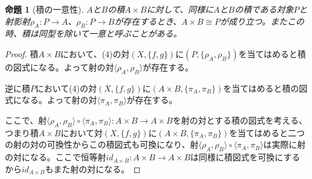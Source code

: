 \documentclass[dvipdfmx]{jsarticle}
\newcommand{\arrow}{\rightarrow}
\newcommand{\tuple}[1]{\langle #1\rangle}
\newcommand{\mor}[3]{#1:#2\arrow #3}
\newtheorem{proof}{証明}[section]
\newtheorem{prop}{命題}[section]
\numberwithin{proof}{subsection}
\numberwithin{prop}{subsection}
\numberwithin{define}{subsection}
\begin{document}
	\begin{prop}[積の一意性]
		$A$と$B$の積$A\times B$に対して、同様に$A$と$B$の積である対象$P$と射影射$\mor{\rho_A}{P}{A}$、$\mor{\rho_B}{P}{B}$が存在するとき、$A\times B\cong P$が成り立つ。またこの時、積は同型を除いて一意と呼ぶことがある。
	\end{prop}
	\begin{proof}
		積$A\times B$において、(4)の対$(X,\{f,g\})$に$(P,\{\rho_A,\rho_B\})$を当てはめると積の図式になる。よって射の対$\tuple{\rho_A,\rho_B}$が存在する。

		逆に積$P$において(4)の対$(X,\{f,g\})$に$(A\times B,\{\pi_A,\pi_B\})$を当てはめると積の図式になる。よって射の対$\tuple{\pi_A,\pi_B}$が存在する。
		\begin{center}
		\end{center}
		ここで、射$\mor{\tuple{\rho_A,\rho_B}\circ\tuple{\pi_A,\pi_B}}{A\times B}{A\times B}$を射の対とする積の図式を考える、つまり積$A\times B$において対$(X,\{f,g\})$に$(A\times B,\{\pi_A,\pi_B\})$を当てはめると二つの射の対の可換性からこの積図式も可換になり、射$\tuple{\rho_A,\rho_B}\circ\tuple{\pi_A,\pi_B}$は実際に射の対になる。ここで恒等射$\mor{id_{A\times B}}{A\times B}{A\times B}$は同様に積図式を可換にするから$id_{A\times B}$もまた射の対になる。


\end{proof}
\end{document}
